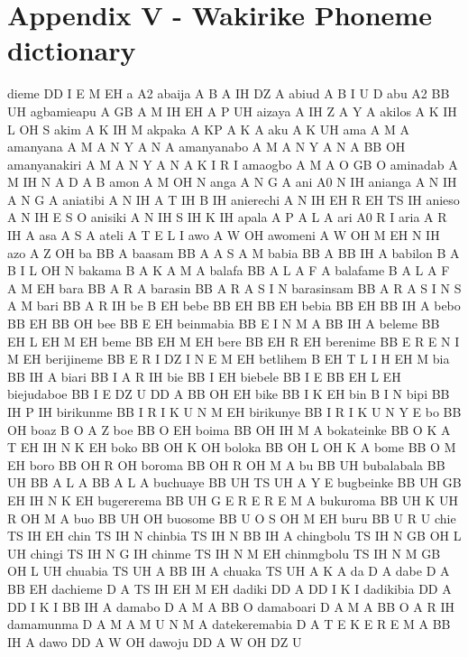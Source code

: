 
\section*{Appendix V - Wakirike Phoneme dictionary}

  dieme DD I E M EH
  a A2
  abaija A B A IH DZ A
  abiud A B I U D
  abu A2 BB UH
  agbamieapu A GB A M IH EH A P UH
  aizaya A IH Z A Y A
  akilos A K IH L OH S
  akim A K IH M
  akpaka A KP A K A
  aku A K UH
  ama A M A
  amanyana A M A N Y A N A
  amanyanabo A M A N Y A N A BB OH
  amanyanakiri A M A N Y A N A K I R I
  amaogbo A M A O GB O
  aminadab A M IH N A D A B
  amon A M OH N
  anga A N G A
  ani A0 N IH
  anianga A N IH A N G A
  aniatibi A N IH A T IH B IH
  anierechi A N IH EH R EH TS IH
  anieso A N IH E S O
  anisiki A N IH S IH K IH
  apala A P A L A
  ari A0 R I
  aria A R IH A
  asa A S A
  ateli A T E L I
  awo A W OH
  awomeni A W OH M EH N IH
  azo A Z OH
  ba BB A
  baasam BB A A S A M
  babia BB A BB IH A
  babilon B A B I L OH N
  bakama B A K A M A
  balafa BB A L A F A
  balafame B A L A F A M EH
  bara BB A R A
  barasin BB A R A S I N
  barasinsam BB A R A S I N S A M
  bari BB A R IH
  be B EH
  bebe BB EH BB EH
  bebia BB EH BB IH A
  bebo BB EH BB OH
  bee BB E EH
  beinmabia BB E I N M A BB IH A
  beleme BB EH L EH M EH
  beme BB EH M EH
  bere BB EH R EH
  berenime BB E R E N I M EH
  berijineme BB E R I DZ I N E M EH
  betlihem B EH T L I H EH M
  bia BB IH A
  biari BB I A R IH
  bie BB I EH
  biebele BB I E BB EH L EH
  biejudaboe BB I E DZ U DD A BB OH EH
  bike BB I K EH
  bin B I N
  bipi BB IH P IH
  birikunme BB I R I K U N M EH
  birikunye BB I R I K U N Y E
  bo BB OH
  boaz B O A Z
  boe BB O EH
  boima BB OH IH M A
  bokateinke BB O K A T EH IH N K EH
  boko BB OH K OH
  boloka BB OH L OH K A
  bome BB O M EH
  boro BB OH R OH
  boroma BB OH R OH M A
  bu BB UH
  bubalabala BB UH BB A L A BB A L A
  buchuaye BB UH TS UH A Y E
  bugbeinke BB UH GB EH IH N K EH
  bugererema BB UH G E R E R E M A
  bukuroma BB UH K UH R OH M A
  buo BB UH OH
  buosome BB U O S OH M EH
  buru BB U R U
  chie TS IH EH
  chin TS IH N
  chinbia TS IH N BB IH A
  chingbolu TS IH N GB OH L UH
  chingi TS IH N G IH
  chinme TS IH N M EH
  chinmgbolu TS IH N M GB OH L UH
  chuabia TS UH A BB IH A
  chuaka TS UH A K A
  da D A
  dabe D A BB EH
  dachieme D A TS IH EH M EH
  dadiki DD A DD I K I
  dadikibia DD A DD I K I BB IH A
  damabo D A M A BB O
  damaboari D A M A BB O A R IH
  damamunma D A M A M U N M A
  datekeremabia D A T E K E R E M A BB IH A
  dawo DD A W OH
  dawoju DD A W OH DZ U
